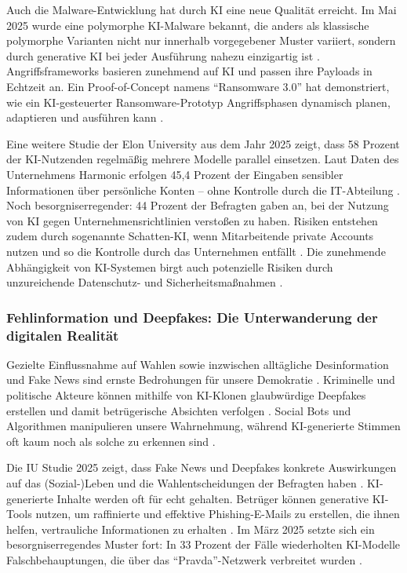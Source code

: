 \documentclass[12pt,a4paper]{article}
\begin{document}
	Auch die Malware-Entwicklung hat durch KI eine neue Qualität erreicht. Im Mai 2025 wurde eine polymorphe KI-Malware bekannt, die anders als klassische polymorphe Varianten nicht nur innerhalb vorgegebener Muster variiert, sondern durch generative KI bei jeder Ausführung nahezu einzigartig ist \cite{ConnectProfessional2025}. Angriffsframeworks basieren zunehmend auf KI und passen ihre Payloads in Echtzeit an. Ein Proof-of-Concept namens \enquote{Ransomware 3.0} hat demonstriert, wie ein KI-gesteuerter Ransomware-Prototyp Angriffsphasen dynamisch planen, adaptieren und ausführen kann \cite{Watchguard2025}.
	
	Eine weitere Studie der Elon University aus dem Jahr 2025 zeigt, dass 58 Prozent der KI-Nutzenden regelmäßig mehrere Modelle parallel einsetzen. Laut Daten des Unternehmens Harmonic erfolgen 45,4 Prozent der Eingaben sensibler Informationen über persönliche Konten – ohne Kontrolle durch die IT-Abteilung \cite{Itwelt2025}. Noch besorgniserregender: 44 Prozent der Befragten gaben an, bei der Nutzung von KI gegen Unternehmensrichtlinien verstoßen zu haben. Risiken entstehen zudem durch sogenannte Schatten-KI, wenn Mitarbeitende private Accounts nutzen und so die Kontrolle durch das Unternehmen entfällt \cite{Datenschutz2025}. Die zunehmende Abhängigkeit von KI-Systemen birgt auch potenzielle Risiken durch unzureichende Datenschutz- und Sicherheitsmaßnahmen \cite{Europarl2025}.
	
	\subsubsection{Fehlinformation und Deepfakes: Die Unterwanderung der digitalen Realität}
	
	Gezielte Einflussnahme auf Wahlen sowie inzwischen alltägliche Desinformation und Fake News sind ernste Bedrohungen für unsere Demokratie \cite{Tagesschau2025}. Kriminelle und politische Akteure können mithilfe von KI-Klonen glaubwürdige Deepfakes erstellen und damit betrügerische Absichten verfolgen \cite{Tagesschau2025}. Social Bots und Algorithmen manipulieren unsere Wahrnehmung, während KI-generierte Stimmen oft kaum noch als solche zu erkennen sind \cite{Sonntagsblatt2025}.
	
	Die IU Studie 2025 zeigt, dass Fake News und Deepfakes konkrete Auswirkungen auf das (Sozial-)Leben und die Wahlentscheidungen der Befragten haben \cite{IU2025}. KI-generierte Inhalte werden oft für echt gehalten. Betrüger können generative KI-Tools nutzen, um raffinierte und effektive Phishing-E-Mails zu erstellen, die ihnen helfen, vertrauliche Informationen zu erhalten \cite{IBM2025}. Im März 2025 setzte sich ein besorgniserregendes Muster fort: In 33 Prozent der Fälle wiederholten KI-Modelle Falschbehauptungen, die über das \enquote{Pravda}-Netzwerk verbreitet wurden \cite{NewsGuard2025}.
	
\end{document}
